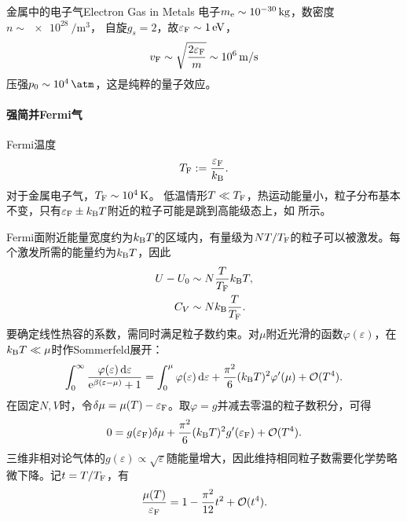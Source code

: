 \begin{example}{金属中的电子气}{Electron Gas in Metals}
	电子$m_{\mathrm{e}} \sim \qty{e-30}{\kilogram}$，数密度$n \sim \qty{e28}{\per\metre\cubed}$， %
	自旋$g_s = 2$，故$\varepsilon_\mathrm F \sim \qty{1}{\electronvolt}$，
	\[
		v_\Fermi \sim \sqrt{\frac{2\varepsilon_\Fermi}m} \sim \qty[per-mode=symbol]{e6}{\metre\per\second}
	\]
	压强$p_0 \sim \qty{e4}{\atm}$，这是纯粹的量子效应。
\end{example}

\paragraph{强简并Fermi气}

Fermi温度
\begin{equation}
	\label{eq:sm-fermi-temperature}
	T_\mathrm F := \frac{\varepsilon_\mathrm F}{k_{\mathrm{B}}}.
\end{equation}
对于金属电子气，$T_\mathrm F \sim \qty{e4}{\kelvin}$。
低温情形$T \ll T_\mathrm F$，热运动能量小，粒子分布基本不变，只有$\varepsilon_\mathrm F \pm k_{\mathrm{B}} T$附近的粒子可能是跳到高能级态上，如 所示。
\begin{notecaptionblock}
	\label{fig:strongly degenerate Fermi gas}
\end{notecaptionblock}
Fermi面附近能量宽度约为$k_{\mathrm{B}} T$的区域内，有量级为$N T/T_\mathrm F$的粒子可以被激发。每个激发所需的能量约为$k_{\mathrm{B}} T$，因此
\begin{align*}
	U - U_0 &\sim N\frac{T}{T_\mathrm F}k_{\mathrm{B}} T,\\
	C_V &\sim Nk_{\mathrm{B}}\frac{T}{T_\mathrm F}.
\end{align*}
要确定线性热容的系数，需同时满足粒子数约束。对$\mu$附近光滑的函数$\varphi(\varepsilon)$，在$k_{\mathrm{B}} T \ll \mu$时作Sommerfeld展开：
\begin{equation}
	\label{eq:sm-sommerfeld-expansion}
	\int_0^\infty\frac{\varphi(\varepsilon)\mathop{}\!\mathrm{d}\varepsilon}{\mathop{}\!\mathrm{e}^{\beta(\varepsilon-\mu)} + 1}
	= \int_0^\mu\varphi(\varepsilon)\mathop{}\!\mathrm{d}\varepsilon
	+ \frac{\pi^2}{6}(k_{\mathrm{B}} T)^2\varphi'(\mu) + \mathcal{O}(T^4).
\end{equation}
在固定$N,V$时，令$\delta\mu = \mu(T) - \varepsilon_\mathrm F$。取$\varphi = g$并减去零温的粒子数积分，可得
\[
	0 = g(\varepsilon_\mathrm F)\delta\mu
	+ \frac{\pi^2}{6}(k_{\mathrm{B}} T)^2g'(\varepsilon_\mathrm F) + \mathcal{O}(T^4).
\]
三维非相对论气体的$g(\varepsilon) \propto \sqrt{\varepsilon}$随能量增大，因此维持相同粒子数需要化学势略微下降。记$t = T/T_\mathrm F$，有
\begin{equation}
	\label{eq:sm-fermi-chemical-potential}
	\frac{\mu(T)}{\varepsilon_\mathrm F} = 1 - \frac{\pi^2}{12}t^2 + \mathcal{O}(t^4).
\end{equation}
